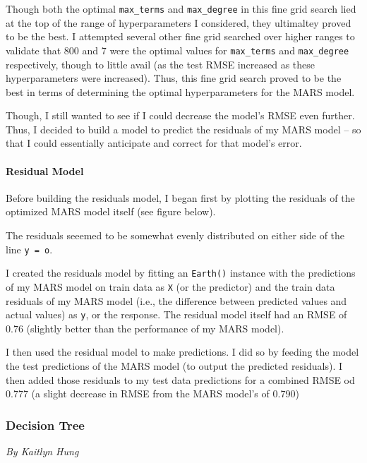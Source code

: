 \documentclass[
  letterpaper,
  DIV=11,
  numbers=noendperiod]{scrartcl}
\let\oldparagraph\paragraph
\renewcommand{\paragraph}[1]{\oldparagraph{#1}\mbox{}}
\begin{document}
Though both the optimal \texttt{max\_terms} and \texttt{max\_degree} in
this fine grid search lied at the top of the range of hyperparameters I
considered, they ultimaltey proved to be the best. I attempted several
other fine grid searched over higher ranges to validate that 800 and 7
were the optimal values for \texttt{max\_terms} and \texttt{max\_degree}
respectively, though to little avail (as the test RMSE increased as
these hyperparameters were increased). Thus, this fine grid search
proved to be the best in terms of determining the optimal
hyperparameters for the MARS model.

Though, I still wanted to see if I could decrease the model's RMSE even
further. Thus, I decided to build a model to predict the residuals of my
MARS model -- so that I could essentially anticipate and correct for
that model's error.

\hypertarget{residual-model}{%
\paragraph{Residual Model}\label{residual-model}}

Before building the residuals model, I began first by plotting the
residuals of the optimized MARS model itself (see figure below).

The residuals seeemed to be somewhat evenly distributed on either side
of the line \texttt{y\ =\ o}.

I created the residuals model by fitting an \texttt{Earth()} instance
with the predictions of my MARS model on train data as \texttt{X} (or
the predictor) and the train data residuals of my MARS model (i.e., the
difference between predicted values and actual values) as \texttt{y}, or
the response. The residual model itself had an RMSE of 0.76 (slightly
better than the performance of my MARS model).

I then used the residual model to make predictions. I did so by feeding
the model the test predictions of the MARS model (to output the
predicted residuals). I then added those residuals to my test data
predictions for a combined RMSE od 0.777 (a slight decrease in RMSE from
the MARS model's of 0.790)

\hypertarget{decision-tree}{%
\subsubsection{Decision Tree}\label{decision-tree}}

\emph{By Kaitlyn Hung}
\end{document}
